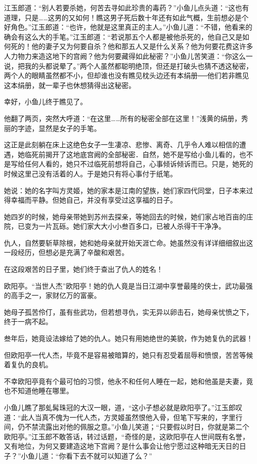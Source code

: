 \documentclass[12pt,oneside]{book}
\begin{document}
江玉郎道：``别人若要杀她，何苦去寻如此珍贵的毒药？''小鱼儿点头道：``这也有道理，只是\ldots\ldots 这男的又如何！瞧这男子死后数十年还有如此气概，生前想必是个好角色。''江玉郎道：``也许，他就是这里真正的主人。''小鱼儿道：``不错，他看来的确会有这么大的手笔。''江玉郎道：``若说那五个人都是被他杀死的，他自己又是如何死的！他的妻子又为何要自杀？他和那五人又是什么关系？他为何要花费这许多人力物力来造这地下的宫阙？他为何要藏得如此秘密？''小鱼儿苦笑道：``你这么一说，把我的头都说晕了。''两个人虽然都聪明绝顶，但还是打破头也猜不透这秘密，两个人的眼睛虽然都不小，但却谁也没有瞧见枕头边还有本绢册──他们若非瞧见这本绢册，就一辈子也休想猜得出这秘密。

幸好，小鱼儿终于瞧见了。

他翻了两页，突然大呼道：``在这里\ldots\ldots 所有的秘密全部在这里！''浅黄的绢册，秀丽的字迹，显然是女子的手笔。

这正是此刻躺在床上这绝色女子一生凄凉、悲惨、离奇、几乎令人难以相信的遭遇，她临死前揭开了这地底宫阙的全部秘密．自然，她不是写给小鱼儿看的，也不是写给任何人看的，她只不过临死前想将自己，心事倾诉倾诉而已。只是，她死的时候这里己没有活着的人。于是她只有将心事付于纸笔。

她说：她的名字叫方灵姬，她的家本是江南的望族，她们家四代同堂，日子本来过得幸福而平静。但她自己，并没有享受过这享福的日子。

她四岁的时候，她母亲带她到苏州去探亲，等她回去的时候，她们家占地百亩的庄院，已变为一片瓦砾。她们家大大小小叁百多口，已被人杀得干干净净。

仇人，自然要斩草除根，她和她母亲就开始天涯亡命。她虽然没有详详细细叙出这一段经历，但想必是充满了辛酸和艰苦。

在这段艰苦的日子里，她们终于查出了仇人的姓名！

欧阳亭。``当世人杰''欧阳亭！她的仇人竟是当日江湖中享誉最隆的侠士，武功最强的高手之一，家财亿万的富豪。

她母子孤苦伶仃，虽有些武功，但若想寻仇，实无异以卵击石，她母亲忧愤之下，终于一病不起。

叁年后，她竟设法嫁给了她的仇人。她只有用她绝世的美貌，作为她复仇的武器！

但欧阳亭一代人杰，毕竟不是容易被暗算的，她只有忍受着屈辱和愤恨，苦苦等候着复仇的良机。

不幸欧阳亭竟有个最可怕的习惯，他永不和任何人睡在一起，她和他虽是夫妻，竟也不知道他睡在哪里。

小鱼儿瞧了那虬髯珠冠的大汉一眼，道，``这小子想必就是欧阳亭了。''江玉郎叹道：``此人当真不傀为一代人杰，方灵姬虽然恨他入骨，但笔下写来的，字里行间，仍不禁流露出对他的佩服之意。''小鱼儿笑道；``只要假以时日，你就是第二个欧阳亭。''江玉郎不敢答话，转过话题，``奇怪的是，这欧阳亭在人世间既有名誉，又有地位，为何又要建造这地下宫阙？是什么事会让他宁愿过这种暗无天日的日子？''小鱼儿道：``你看下去不就可以知道了么？''
\end{document}

